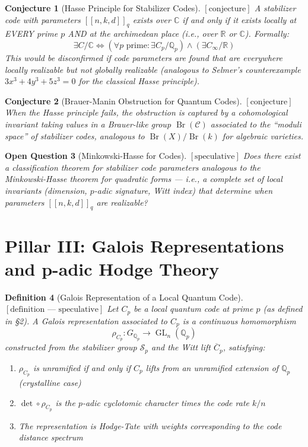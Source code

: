\documentclass[12pt]{article}
\newtheorem{definition}{Definition}[section]
\newtheorem{conjecture}[definition]{Conjecture}
\newtheorem{question}[definition]{Open Question}
\theoremstyle{remark}
\begin{document}
\begin{conjecture}[Hasse Principle for Stabilizer Codes]
$[\text{conjecture}]$
A stabilizer code with parameters $[[n,k,d]]_q$ exists over $\mathbb{C}$
if and only if it exists locally at EVERY prime $p$ AND at the archimedean
place (i.e., over $\mathbb{R}$ or $\mathbb{C}$). Formally:
\[
\exists C/\mathbb{C} \iff
\left(\forall p \text{ prime}: \exists C_p/\mathbb{Q}_p\right) \land
\left(\exists C_\infty/\mathbb{R}\right)
\]
This would be disconfirmed if code parameters are found that are everywhere
locally realizable but not globally realizable (analogous to Selmer's
counterexample $3x^3 + 4y^3 + 5z^3 = 0$ for the classical Hasse principle).
\end{conjecture}

\begin{conjecture}[Brauer-Manin Obstruction for Quantum Codes]
$[\text{conjecture}]$
When the Hasse principle fails, the obstruction is captured by a
cohomological invariant taking values in a Brauer-like group
$\operatorname{Br}(\mathcal{C})$ associated to the ``moduli space''
of stabilizer codes, analogous to $\operatorname{Br}(X)/\operatorname{Br}(k)$
for algebraic varieties.
\end{conjecture}

\begin{question}[Minkowski-Hasse for Codes]
$[\text{speculative}]$
Does there exist a classification theorem for stabilizer code parameters
analogous to the Minkowski-Hasse theorem for quadratic forms — i.e., a
complete set of local invariants (dimension, $p$-adic signature, Witt index)
that determine when parameters $[[n,k,d]]_q$ are realizable?
\end{question}

\section{Pillar III: Galois Representations and p-adic Hodge Theory}

\begin{definition}[Galois Representation of a Local Quantum Code]
$[\text{definition — speculative}]$
Let $C_p$ be a local quantum code at prime $p$ (as defined in \S 2).
A \emph{Galois representation} associated to $C_p$ is a continuous
homomorphism
\[
\rho_{C_p}: G_{\mathbb{Q}_p} \to \operatorname{GL}_n(\mathbb{Q}_p)
\]
constructed from the stabilizer group $\mathcal{S}_p$ and the Witt lift
$\overline{C}_p$, satisfying:
\begin{enumerate}
\item $\rho_{C_p}$ is unramified if and only if $C_p$ lifts from an
  unramified extension of $\mathbb{Q}_p$ (crystalline case)
\item $\det \circ \rho_{C_p}$ is the $p$-adic cyclotomic character times
  the code rate $k/n$
\item The representation is Hodge-Tate with weights corresponding to the
  code distance spectrum
\end{enumerate}
\end{definition}
\end{document}
